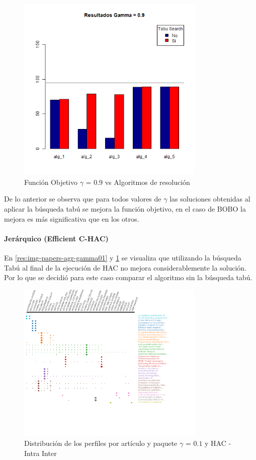 \begin{figure}[H]
  \centering
    \includegraphics[width=0.8\textwidth]{resultados/papers/Graficos_agrupados/gamma09.png}
  \caption{Función Objetivo $\gamma$ = $0.9$ vs Algoritmos de resolución}
  \label{res:img-papers-agr-gamma09}
\end{figure}

De lo anterior se observa que para todos valores de $\gamma$ las soluciones obtenidas al aplicar la búsqueda tabú se mejora la función objetivo, en el caso de BOBO la mejora es más significativa que en los otros.\\

\paragraph{Jerárquico (Efficient C-HAC)}
En \ref{res:img-papers-agr-gamma01} y \ref{res:img-papers-agr-gamma09} se visualiza que utilizando la búsqueda Tabú al final de la ejecución de HAC no mejora considerablemente la solución. Por lo que se decidió para este caso comparar el algoritmo sin la búsqueda tabú.
\begin{figure}[H]
  \centering
    \includegraphics[width=0.8\textwidth]{resultados/papers/HAC/INTRA_INTER/gamma-01.png}
  \caption{Distribución de los perfiles por artículo y paquete $\gamma$ = $0.1$ y HAC - Intra Inter}
  \label{res:img-papers-gamma01-hac-intra-inter}
\end{figure}

